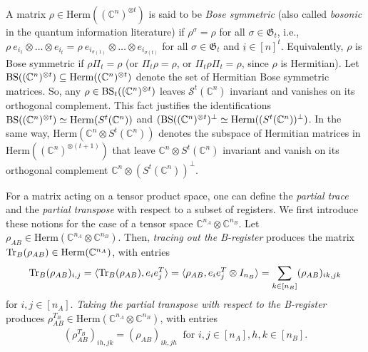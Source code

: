 \documentclass[11pt]{article}
\newcommand{\C}{\ensuremath{\mathbb{C}}} %
\newcommand{\Perm}{\mathfrak G}
\newcommand{\MS}{{\mathcal S}}
\newcommand{\MV}{{\mathcal V}}
\newcommand{\Herm}{\mathrm{Herm}}
\newcommand{\Cnt}{(\C^n)^{\ot t}}
\newcommand{\Tr}{\text{\rm Tr}}
\newcommand{\ot}{\otimes}
\newcommand{\BS}{\text{\rm BS}}
\newcommand{\ui}{\underline{i}}
\theoremstyle{plain}
\newcommand{\ML}{\textcolor{blue}}
\begin{document}
A matrix  $\rho\in \Herm(\Cnt)$  is said to be {\em Bose symmetric}
(also called  {\em bosonic} in the quantum information literature) 
if $\rho^\sigma=\rho$ for all $\sigma\in\Perm_t$, i.e.,  $\rho\  e_{i_1}\ot \ldots\ot e_{i_t}= \rho \ e_{i_{\sigma(1)}}\ot\ldots \ot e_{i_{\sigma(t)}}$ for all $\sigma\in\Perm_t$ and $\ui\in [n]^t$. Equivalently, $\rho$ is Bose symmetric if $\rho \Pi_t= \rho$ (or $\Pi_t\rho=\rho$, or $\Pi_t\rho\Pi_t=\rho$, since $\rho$ is Hermitian).
Let $\BS(\Cnt)\subseteq \Herm(\Cnt)$ denote the set of Hermitian Bose symmetric matrices. So,  any $\rho\in \BS_t(\Cnt)$ leaves $\MS^t(\C^n)$ invariant and vanishes on its orthogonal complement. 
This fact justifies the identifications $\BS(\Cnt) \simeq \Herm(S^t(\C^n))$ and
$(\BS(\Cnt)^\perp\simeq \Herm(  (S^t(\C^n))^\perp)$.
In the same way,
$\Herm(\C^n\ot S^t(\C^n))$ denotes the subspace of Hermitian matrices in $\Herm((\C^n)^{\ot (t+1)})$ that leave $\C^n\ot S^t(\C^n)$ invariant and vanish on its orthogonal complement $\C^n\ot (S^t(\C^n))^\perp$.





\smallskip
For a matrix acting on a tensor product space, one can define   the {\em partial trace} and the {\em partial transpose}   with respect to a subset of  registers. We first introduce these notions for the case of a tensor space $\C^{n_A}\ot \C^{n_B}$.  
Let $\rho_{AB}\in \Herm(\C^{n_A}\ot \C^{n_B})$. Then, {\em tracing out the B-register} produces the matrix $\Tr_B(\rho_{AB})\in\Herm(\C^{n_A})$, with entries
\begin{align}\label{eq:trace1}
\Tr_B(\rho_{AB})_{i,j}=\langle \Tr_B(\rho_{AB}), e_ie_{j}^T\rangle = 
\langle \rho_{AB}, e_ie_{j}^T \ot I_{n_B}\rangle = \sum_{k\in [n_B]} (\rho_{AB})_{ik,jk} 
\end{align}
for $i,j\in [n_A]$. {\em Taking the partial transpose with respect to the B-register} produces 
$\rho_{AB}^{T_B}\in\Herm(\C^{n_A}\ot \C^{n_B})$, with entries
\begin{align}\label{eq:transpose1}
(\rho_{AB}^{T_B})_{ih,jk}= (\rho_{AB})_{ik,jh}\ \text{ for } i,j\in [n_A], h,k\in [n_B].
\end{align}
\end{document}
